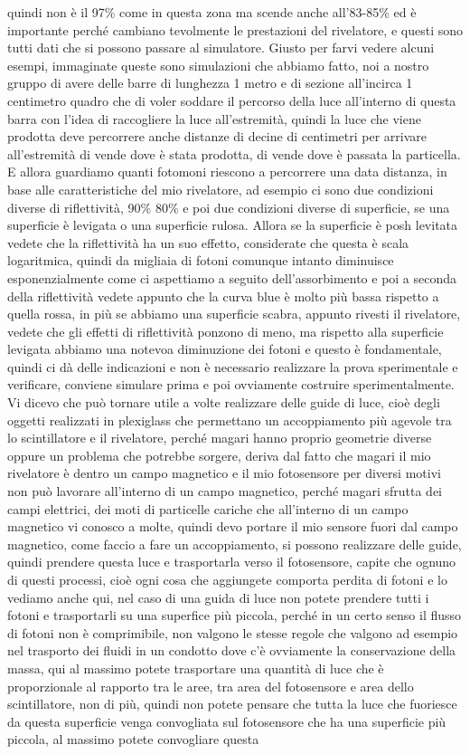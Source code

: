 quindi non è il 97\% come in questa zona ma scende anche all'83-85\% ed è importante perché cambiano tevolmente le prestazioni del rivelatore, e questi sono tutti dati che si possono passare al simulatore. Giusto per farvi vedere alcuni esempi, immaginate queste sono simulazioni che abbiamo fatto, noi a nostro gruppo di avere delle barre di lunghezza 1 metro e di sezione all'incirca 1 centimetro quadro che di voler soddare il percorso della luce all'interno di questa barra con l'idea di raccogliere la luce all'estremità, quindi la luce che viene prodotta deve percorrere anche distanze di decine di centimetri per arrivare all'estremità di vende dove è stata prodotta, di vende dove è passata la particella. E allora guardiamo quanti fotomoni riescono a percorrere una data distanza, in base alle caratteristiche del mio rivelatore, ad esempio ci sono due condizioni diverse di riflettività, 90\% 80\% e poi due condizioni diverse di superficie, se una superficie è levigata o una superficie rulosa. Allora se la superficie è posh levitata vedete che la riflettività ha un suo effetto, considerate che questa è scala logaritmica, quindi da migliaia di fotoni comunque intanto diminuisce esponenzialmente come ci aspettiamo a seguito dell'assorbimento e poi a seconda della riflettività vedete appunto che la curva blue è molto più bassa rispetto a quella rossa, in più se abbiamo una superficie scabra, appunto rivesti il rivelatore, vedete che gli effetti di riflettività ponzono di meno, ma rispetto alla superficie levigata abbiamo una notevoa diminuzione dei fotoni e questo è fondamentale, quindi ci dà delle indicazioni e non è necessario realizzare la prova sperimentale e verificare, conviene simulare prima e poi ovviamente costruire sperimentalmente. Vi dicevo che può tornare utile a volte realizzare delle guide di luce, cioè degli oggetti realizzati in plexiglass che permettano un accoppiamento più agevole tra lo scintillatore e il rivelatore, perché magari hanno proprio geometrie diverse oppure un problema che potrebbe sorgere, deriva dal fatto che magari il mio rivelatore è dentro un campo magnetico e il mio fotosensore per diversi motivi non può lavorare all'interno di un campo magnetico, perché magari sfrutta dei campi elettrici, dei moti di particelle cariche che all'interno di un campo magnetico vi conosco a molte, quindi devo portare il mio sensore fuori dal campo magnetico, come faccio a fare un accoppiamento, si possono realizzare delle guide, quindi prendere questa luce e trasportarla verso il fotosensore, capite che ognuno di questi processi, cioè ogni cosa che aggiungete comporta perdita di fotoni e lo vediamo anche qui, nel caso di una guida di luce non potete prendere tutti i fotoni e trasportarli su una superfice più piccola, perché in un certo senso il flusso di fotoni non è comprimibile, non valgono le stesse regole che valgono ad esempio nel trasporto dei fluidi in un condotto dove c'è ovviamente la conservazione della massa, qui al massimo potete trasportare una quantità di luce che è proporzionale al rapporto tra le aree, tra area del fotosensore e area dello scintillatore, non di più, quindi non potete pensare che tutta la luce che fuoriesce da questa superficie venga convogliata sul fotosensore che ha una superficie più piccola, al massimo potete convogliare questa 